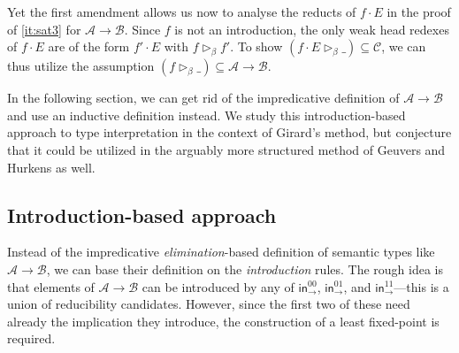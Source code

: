 \documentclass[a4paper,USenglish,cleveref, autoref, thm-restate]{lipics-v2019}
\newcommand{\tin}{\ensuremath{\mathsf{in}}}
\newcommand{\inn}[2]{\ensuremath{\tin_{#1}^{#2}}}
\newcommand{\whd}[1][]{\rhd_{#1}}
\newcommand{\CR}{\mathsf{CR}}
\newcommand{\A}{\mathcal{A}}
\newcommand{\B}{\mathcal{B}}
\newcommand{\C}{\mathcal{C}}
\newcommand{\SAT}{\mathsf{SAT}}
\begin{document}
Yet the first amendment allows us now to analyse the reducts of
$f \cdot E$ in the proof of \ref{it:sat3} for $\A \to \B$.  Since $f$
is not an introduction, the only weak head redexes of $f \cdot E$ are
of the form $f' \cdot E$ with $f \whd[\beta] f'$.  To show $(f \cdot E
\whd[\beta] \_) \subseteq \C$, we can thus utilize the assumption
$(f \whd[\beta] \_) \subseteq \A \to \B$.


In the following section, we can get rid of the
impredicative definition of $\A \to \B$ and use an inductive
definition instead.
We study this introduction-based approach to type interpretation in
the context of Girard's method, but conjecture that it could be
utilized in the arguably more structured method of Geuvers and Hurkens as
well.



\subsection{Introduction-based approach}
\label{sec:introbased}

Instead of the impredicative \emph{elimination}-based definition of semantic
types like $\A \to \B$, we can base their definition on the \emph{introduction}
rules.  The rough idea is that elements of $\A \to \B$ can be
introduced by any of $\inn\to{00}$, $\inn\to{01}$, and
$\inn\to{11}$---this is a union of reducibility candidates.
However, since the first two of these need already the implication
they introduce, the construction of a least fixed-point is required.
\end{document}

